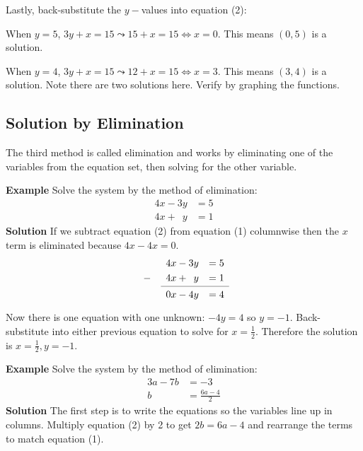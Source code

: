 Lastly, back-substitute the $y-$values into equation (2): 
 
 When $y =5$, $3 y +x =15 \leadsto 15 +x =15 \Longleftrightarrow x =0$. This means $\left (0 ,5\right )$ is a solution. 
 
 When $y =4$, $3 y +x =15 \leadsto 12 +x =15 \Longleftrightarrow x =3$. This means $\left (3 ,4\right )$ is a solution. 
 Note there are two solutions here. Verify by graphing the functions.
\subsection*{Solution by Elimination} 
The third method is called elimination and works by eliminating one of the variables from the equation set, then solving for the other variable.

\textbf{Example} Solve the system by the method of elimination:
\begin{align*}
4x-3y&=5\tag{1}\\
4x+\phantom{1}y&=1\tag{2}
\end{align*}
\textbf{Solution} If we subtract equation (2) from equation (1) columnwise then the $x$ term is eliminated because $4x-4x=0$.
\[\begin{array}{lrl}
  			 &4x-3y	         &=5 \\[\jot]
 -\phantom{1}&4x+\phantom{1}y&=1 \\
\cmidrule{2-3}
 & 0x-4y &=4  \\[\jot]
\end{array}\]
Now there is one equation with one unknown: $-4y=4$ so $y=-1$. Back-substitute into either previous equation to solve for $x=\frac{1}{2}$. Therefore the solution is $x=\frac{1}{2},y=-1$.

\textbf{Example} Solve the system by the method of elimination:
\begin{align*}
3a-7b&=-3\tag{1}\\
b&=\frac{6a-4}{2}\tag{2}
\end{align*}
\textbf{Solution} The first step is to write the equations so the variables line up in columns. Multiply equation (2) by 2 to get $2b=6a-4$ and rearrange the terms to match equation (1). 

